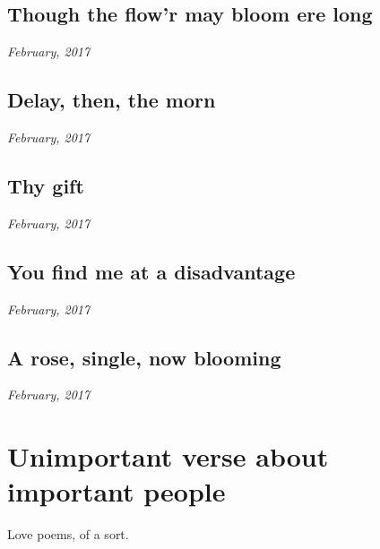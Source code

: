 \documentclass[10pt]{memoir}
\begin{document}
  \section{Though the flow'r may bloom ere long}

  \hfill\textit{February, 2017}

  
  \newpage


  \section{Delay, then, the morn}

  \hfill\textit{February, 2017}

  
  \newpage


  \section{Thy gift}

  \hfill\textit{February, 2017}

  
  \newpage


  \section{You find me at a disadvantage}

  \hfill\textit{February, 2017}

  
  \newpage


  \section{A rose, single, now blooming}

  \hfill\textit{February, 2017}
  \null
  


  \chapter{Unimportant verse about important people}

  Love poems, of a sort.

  \vfill
\end{document}
